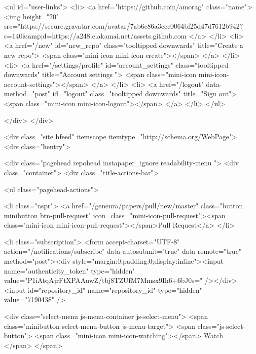             

  
    <ul id="user-links">
      <li>
        <a href="https://github.com/amorag" class="name">
          <img height="20" src="https://secure.gravatar.com/avatar/7ab6c86a3ccc0064bf25d47d7612b942?s=140&amp;d=https://a248.e.akamai.net/assets.github.com%
        </a>
      </li>
      <li>
        <a href="/new" id="new_repo" class="tooltipped downwards" title="Create a new repo">
          <span class="mini-icon mini-icon-create"></span>
        </a>
      </li>
      <li>
        <a href="/settings/profile" id="account_settings"
          class="tooltipped downwards"
          title="Account settings ">
          <span class="mini-icon mini-icon-account-settings"></span>
        </a>
      </li>
      <li>
        <a href="/logout" data-method="post" id="logout" class="tooltipped downwards" title="Sign out">
          <span class="mini-icon mini-icon-logout"></span>
        </a>
      </li>
    </ul>



            
          </div>
        </div>


      

      


            <div class="site hfeed" itemscope itemtype="http://schema.org/WebPage">
      <div class="hentry">
        
        <div class="pagehead repohead instapaper_ignore readability-menu ">
          <div class="container">
            <div class="title-actions-bar">
              


<ul class="pagehead-actions">

    <li class="nspr">
      <a href="/geneura/papers/pull/new/master" class="button minibutton btn-pull-request" icon_class="mini-icon-pull-request"><span class="mini-icon mini-icon-pull-request"></span>Pull Request</a>
    </li>

    <li class="subscription">
      <form accept-charset="UTF-8" action="/notifications/subscribe" data-autosubmit="true" data-remote="true" method="post"><div style="margin:0;padding:0;display:inline"><input name="authenticity_token" type="hidden" value="P1iAtqAjrFtXPAAuwZ/tbj8TZUfM7Mmsx9Ih6+6bJ0s=" /></div>  <input id="repository_id" name="repository_id" type="hidden" value="7190438" />

    <div class="select-menu js-menu-container js-select-menu">
      <span class="minibutton select-menu-button js-menu-target">
        <span class="js-select-button">
          <span class="mini-icon mini-icon-watching"></span>
          Watch
        </span>
      </span>

